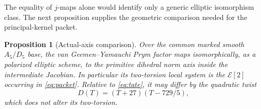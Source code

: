 \documentclass[11pt]{article}
\numberwithin{equation}{section}
\newtheorem{proposition}[theorem]{Proposition}
\theoremstyle{definition}
\theoremstyle{remark}
\begin{document}
The equality of \(j\)-maps alone would identify only a generic elliptic
isomorphism class.  The next proposition supplies the geometric comparison
needed for the principal-kernel packet.

\begin{proposition}[Actual-axis comparison]\label{prop:actual-axis}
Over the common marked smooth \(A_5/D_5\) base, the van Geemen--Yamauchi
Prym factor maps isomorphically, as a polarized
elliptic scheme, to the
primitive dihedral norm axis inside the intermediate Jacobian.  In
particular its two-torsion local system is the \(\mathcal E[2]\) occurring in
\eqref{eq:packet}.  Relative to \eqref{eq:tate}, it may differ by the
quadratic twist
\[
 D(T)=(T+27)(T-729/5),
\]
which does not alter its two-torsion.
\end{proposition}
\end{document}
